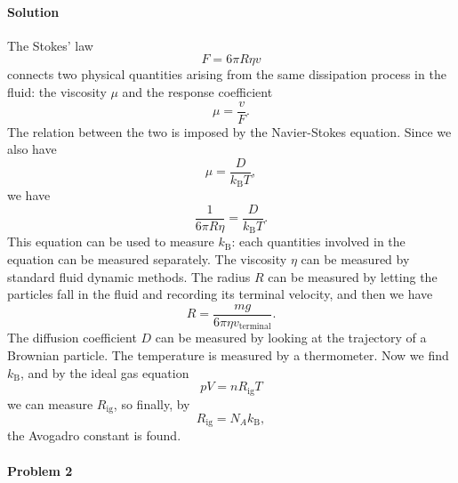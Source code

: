 \documentclass[hyperref, a4paper]{article}
\begin{document}
\paragraph{Solution} The Stokes' law 
\begin{equation}
    F = 6 \pi R \eta v 
\end{equation}
connects two physical quantities arising from the same dissipation process in the fluid:
the viscosity $\mu$ and the response coefficient
\begin{equation}
    \mu = \frac{v}{F}.
\end{equation}
The relation between the two is imposed by the Navier-Stokes equation.
Since we also have 
\begin{equation}
    \mu = \frac{D}{k_{\text{B}} T},
\end{equation}
we have 
\begin{equation}
    \frac{1}{6 \pi R \eta} = \frac{D}{k_{\text{B}} T}.
\end{equation}
This equation can be used to measure $k_{\text{B}}$:
each quantities involved in the equation can be measured separately.
The viscosity $\eta$ can be measured by standard fluid dynamic methods.
The radius $R$ can be measured by letting the particles fall in the fluid 
and recording its terminal velocity,
and then we have 
\begin{equation}
    R = \frac{mg}{6 \pi \eta v_{\text{terminal}}}.
\end{equation}
The diffusion coefficient $D$ can be measured by looking at the trajectory of a Brownian particle.
The temperature is measured by a thermometer.
Now we find $k_{\text{B}}$,
and by the ideal gas equation 
\begin{equation}
    p V = n R_{\text{ig}} T
\end{equation}
we can measure $R_{\text{ig}}$,
so finally, by 
\begin{equation}
    R_{\text{ig}} = N_A k_{\text{B}},
\end{equation}
the Avogadro constant is found.

\paragraph{Problem 2} 
\end{document}
